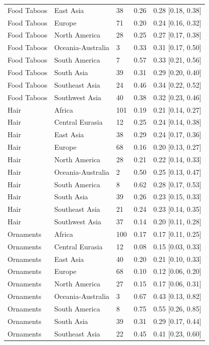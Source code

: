 \begin{longtable}{lllll}
Food Taboos & East Asia & 38 & 0.26 & 0.28 [0.18, 0.38] \\
Food Taboos & Europe & 71 & 0.20 & 0.24 [0.16, 0.32] \\
Food Taboos & North America & 28 & 0.25 & 0.27 [0.17, 0.38] \\
Food Taboos & Oceania-Australia & 3 & 0.33 & 0.31 [0.17, 0.50] \\
Food Taboos & South America & 7 & 0.57 & 0.33 [0.21, 0.56] \\
Food Taboos & South Asia & 39 & 0.31 & 0.29 [0.20, 0.40] \\
Food Taboos & Southeast Asia & 24 & 0.46 & 0.34 [0.22, 0.52] \\
Food Taboos & Southwest Asia & 40 & 0.38 & 0.32 [0.23, 0.46] \\
Hair & Africa & 101 & 0.19 & 0.21 [0.14, 0.27] \\
Hair & Central Eurasia & 12 & 0.25 & 0.24 [0.14, 0.38] \\
Hair & East Asia & 38 & 0.29 & 0.24 [0.17, 0.36] \\
Hair & Europe & 68 & 0.16 & 0.20 [0.13, 0.27] \\
Hair & North America & 28 & 0.21 & 0.22 [0.14, 0.33] \\
Hair & Oceania-Australia & 2 & 0.50 & 0.25 [0.13, 0.47] \\
Hair & South America & 8 & 0.62 & 0.28 [0.17, 0.53] \\
Hair & South Asia & 39 & 0.26 & 0.23 [0.15, 0.33] \\
Hair & Southeast Asia & 21 & 0.24 & 0.23 [0.14, 0.35] \\
Hair & Southwest Asia & 37 & 0.14 & 0.20 [0.11, 0.28] \\
Ornaments & Africa & 100 & 0.17 & 0.17 [0.11, 0.25] \\
Ornaments & Central Eurasia & 12 & 0.08 & 0.15 [0.03, 0.33] \\
Ornaments & East Asia & 40 & 0.20 & 0.21 [0.10, 0.33] \\
Ornaments & Europe & 68 & 0.10 & 0.12 [0.06, 0.20] \\
Ornaments & North America & 27 & 0.15 & 0.17 [0.06, 0.31] \\
Ornaments & Oceania-Australia & 3 & 0.67 & 0.43 [0.13, 0.82] \\
Ornaments & South America & 8 & 0.75 & 0.55 [0.26, 0.85] \\
Ornaments & South Asia & 39 & 0.31 & 0.29 [0.17, 0.44] \\
Ornaments & Southeast Asia & 22 & 0.45 & 0.41 [0.23, 0.60] \\

\end{longtable}
